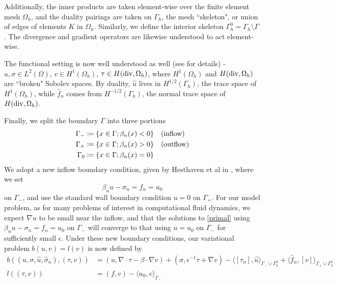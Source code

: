 \documentclass[11pt,onecolumn]{scrartcl}
\newcommand{\grad}{\nabla}
\renewcommand{\div}{\grad \cdot}
\begin{document}
Additionally, the inner products are taken element-wise over the finite element mesh $\Omega_h$, and the duality pairings are taken on $\Gamma_h$, the mesh ``skeleton", or union of edges of elements $K$ in $\Omega_h$.  Similarly, we define the interior skeleton $\Gamma_h^0 = \Gamma_h \setminus \Gamma$. The divergence and gradient operators are likewise understood to act element-wise. 

 The functional setting is now well understood as well (see \cite{analysisDPG} for details) - $u,\sigma \in L^2(\Omega)$, $v \in H^1(\Omega_h)$, $\tau \in H({\rm div},\Omega_h)$, where $H^1(\Omega_h)$ and $H({\rm div},\Omega_h)$ are ``broken" Sobolev spaces.  By duality, $\widehat{u}$ lives in $H^{1/2}(\Gamma_h)$, the trace space of $H^1(\Omega_h)$, while $\widehat{f}_n$ comes from $H^{-1/2}(\Gamma_h)$, the normal trace space of $H({\rm div},\Omega_h)$.  

Finally, we split the boundary $\Gamma$ into three portions
\begin{align*}
\Gamma_{-} &\coloneqq \{x\in \Gamma; \beta_n(x) < 0\} \quad {\rm (inflow)}\\
\Gamma_{+} &\coloneqq \{x\in \Gamma; \beta_n(x) > 0\} \quad {\rm (outflow)}\\
\Gamma_{0} &\coloneqq \{x\in \Gamma; \beta_n(x) = 0\}
\end{align*}
We adopt a new inflow boundary condition, given by Hesthaven et al in \cite{Hesthaven96astable}, where we set
\[
\beta_n u - \sigma_n = f_n = u_0
\]
on $\Gamma_-$, and use the standard wall boundary condition $u=0$ on $\Gamma_+$.  For our model problem,
as for many problems of interest in computational fluid dynamics, we
expect $\grad u$ to be small near the inflow, and that the solutions
to \eqref{primal} using $\beta_n u - \sigma_n = f_n = u_0$ on $\Gamma_-$
will converge to that using $u=u_0$ on $\Gamma_-$  for sufficiently small $\epsilon$.
Under these new boundary conditions, our variational problem $b(u,v) =
l(v)$ is now defined by
\begin{align*}
b\left(\left(u,\sigma, \widehat{u}, \widehat{\sigma}_n\right),
\left(\tau, v\right)\right) &= \left(u,\div \tau - \beta \cdot \grad
v\right) + \left(\sigma, \epsilon^{-1} \tau + \grad v\right) - \langle
\left[\tau_n\right], \widehat{u} \rangle_{\Gamma_-\cup \Gamma_h^0} +
\langle \widehat{f}_n, \left[v\right] \rangle_{\Gamma_+ \cup
  \Gamma_h^0} \\ l\left(\left(\tau,v\right)\right) &= \left(f,
v\right) %
- \langle u_0, v \rangle_{\Gamma_-}
\end{align*}
\end{document}
